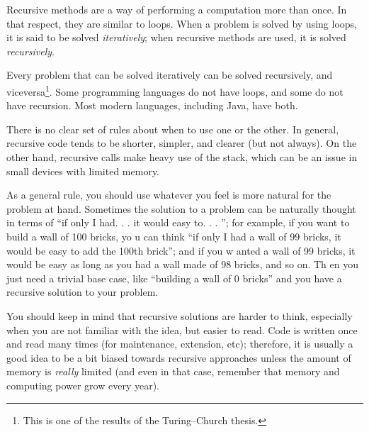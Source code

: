 Recursive methods are a way of performing a computation more than
once. In that respect, they are similar to loops. When a problem is
solved by using loops, it is said to be solved \emph{iteratively};
when recursive methods are used, it is solved \emph{recursively}. 

Every problem that can be solved iteratively can be solved
recursively, and viceversa\footnote{This is one of the results of the
 Turing--Church thesis.}. Some programming languages do not have
loops, and some do not have recursion. Most modern languages,
including Java, have both. 

There is no clear set of rules about when to use one or the other. In
general, recursive code tends to be shorter, simpler, and clearer (but
not always). On the other hand, recursive calls make heavy use of the
stack, which can be an issue in small devices with limited memory. 

As a general rule, you should use whatever you feel is more natural
for the problem at hand. Sometimes the solution to a problem can be
naturally thought in terms of “if only I had. . . it would easy
to. . . ”; for example, if you want to build a wall of 100 bricks, yo
u can think “if only I had a wall of 99 bricks, it would be easy to
add the 100th brick”; and if you w anted a wall of 99 bricks, it would
be easy as long as you had a wall made of 98 bricks, and so on. Th en
you just need a trivial base case, like “building a wall of 0 bricks”
and you have a recursive solution to your problem.

You should keep in mind that recursive
solutions are harder to think, especially when you are not familiar
with the idea, but easier to read. Code is written once and read many
times (for maintenance, extension, etc); therefore, it is usually a good
idea to be a bit biased towards recursive approaches unless the amount
of memory is \emph{really} limited (and even in that case, remember that
memory and computing power grow every year). 




